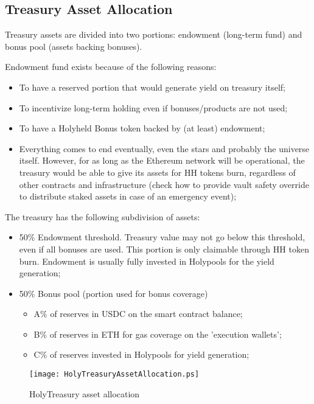 \documentclass[12pt]{article}
\begin{document}
\subsection{Treasury Asset Allocation}

Treasury assets are divided into two portions: endowment (long-term fund) and bonus pool (assets backing bonuses).

\bigskip

Endowment fund exists because of the following reasons:
\begin{itemize}
\item To have a reserved portion that would generate yield on treasury itself;
\item To incentivize long-term holding even if bonuses/products are not used;
\item To have a Holyheld Bonus token backed by (at least) endowment;
\item Everything comes to end eventually, even the stars and probably the universe itself. However, for as long as the Ethereum network will be operational, the treasury would be able to give its assets for HH tokens burn, regardless of other contracts and infrastructure (check how to provide vault safety override to distribute staked assets in case of an emergency event);
\end{itemize}

The treasury has the following subdivision of assets:
\begin{itemize}
\item 50\% Endowment threshold. Treasury value may not go below this threshold, even if
  all bonuses are used. This portion is only claimable through HH token burn.
  Endowment is usually fully invested in Holypools for the yield generation;
\item 50\% Bonus pool (portion used for bonus coverage)
  \begin{itemize}
    \item A\% of reserves in USDC on the smart contract balance;
    \item B\% of reserves in ETH for gas coverage on the 'execution wallets';
    \item C\% of reserves invested in Holypools for yield generation;
  \end{itemize}
\end{itemize}

\begin{figure}[h]
  \begin{center}
    \centering
    \texttt{[image: HolyTreasuryAssetAllocation.ps]}
    \caption[Figure 1]{HolyTreasury asset allocation\label{fig:ht_asset_alloc}}
  \end{center}
\end{figure}
\end{document}
